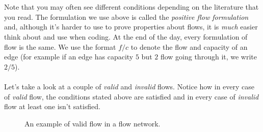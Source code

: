 \documentclass[11pt]{article}
\theoremstyle{plain}
\theoremstyle{definition}
\begin{document}
\\\\
Note that you may often see different conditions depending on the literature that you read. The formulation we use above is called the \emph{positive flow formulation} and, although it's harder to use to prove properties about flows, it is \emph{much} easier think about and use when coding. At the end of the day, every formulation of flow is the same. We use the format $f / c$ to denote the flow and capacity of an edge (for example if an edge has capacity $5$ but $2$ flow going through it, we write $2/5$).
\\\\
Let's take a look at a couple of \emph{valid} and \emph{invalid} flows. Notice how in every case of \emph{valid} flow, the conditions stated above are satisfied and in every case of \emph{invalid} flow at least one isn't satisfied.
\begin{figure}[!ht]
\caption{An example of valid flow in a flow network.}
\centering
{}
\end{figure}
\\
\end{document}
